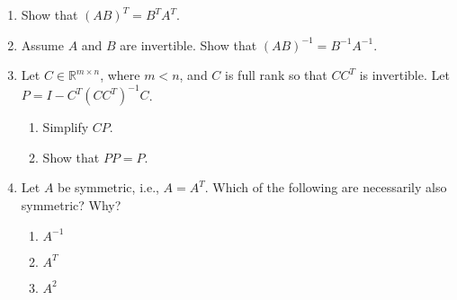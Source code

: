 \documentclass{article}
\begin{document}
\begin{enumerate}
\item Show that $(AB)^T=B^T A^T$.  
\item Assume $A$ and $B$ are invertible.  Show that $(A B)^{-1} = B^{-1} A^{-1} $.
\item Let $C \in \mathbb{R}^{m \times n}$, where $m < n$, and $C$ is full rank so that $CC^T$ is invertible.  Let $P = I - C^T(CC^T)^{-1}C$.    
  \begin{enumerate}
  \item Simplify $CP$.
  \item Show that $PP=P$.
  \end{enumerate}
\item Let $A$ be symmetric, i.e., $A = A^T$.  Which of the following are necessarily also symmetric? Why?
  \begin{enumerate}
  \item $A^{-1}$
  \item  $A^T$
  \item $A^2$
  \end{enumerate}
  


\end{enumerate}
\end{document}
